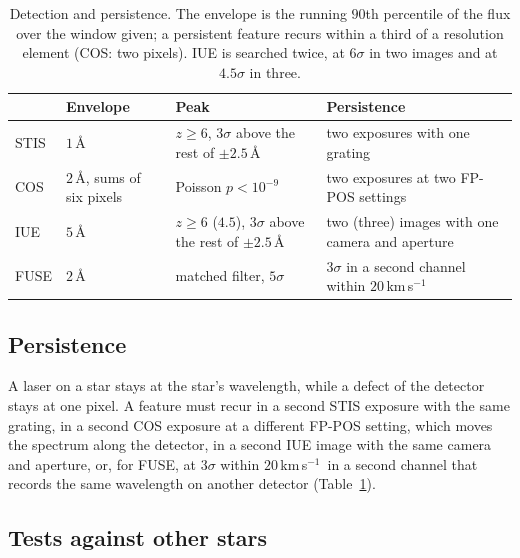 \documentclass[3p,11pt]{elsarticle}
\newcommand{\kms}{km\,s$^{-1}$}
\begin{document}
\begin{table}[t]
\centering\small
\setlength{\tabcolsep}{5pt}
\caption{Detection and persistence. The envelope is the running $90$th percentile of the
flux over the window given; a persistent feature recurs within a third of a resolution
element (COS: two pixels). IUE is searched twice, at $6\sigma$ in two images and at
$4.5\sigma$ in three.}
\label{tab:detect}
\begin{tabular}{@{}l>{\raggedright\arraybackslash}p{3.0cm}>{\raggedright\arraybackslash}p{5.4cm}>{\raggedright\arraybackslash}p{5.0cm}@{}}
\toprule
 & Envelope & Peak & Persistence\\
\midrule
STIS & $1$\,\AA & $z\ge6$, $3\sigma$ above the rest of $\pm2.5$\,\AA & two exposures with one grating\\
COS & $2$\,\AA, sums of six pixels & Poisson $p<10^{-9}$ & two exposures at two FP-POS settings\\
IUE & $5$\,\AA & $z\ge6$ ($4.5$), $3\sigma$ above the rest of $\pm2.5$\,\AA & two (three) images with one camera and aperture\\
FUSE & $2$\,\AA & matched filter, $5\sigma$ & $3\sigma$ in a second channel within $20$\,\kms\\
\bottomrule
\end{tabular}
\end{table}

\subsection{Persistence}

A laser on a star stays at the star's wavelength, while a defect of the detector stays
at one pixel. A feature must recur in a second STIS exposure with the same grating, in a
second COS exposure at a different FP-POS setting, which moves the spectrum along the
detector, in a second IUE image with the same camera and aperture, or, for FUSE, at
$3\sigma$ within $20$\,\kms\ in a second channel that records the same wavelength on
another detector (Table~\ref{tab:detect}).

\subsection{Tests against other stars}\label{sec:tests}
\end{document}
